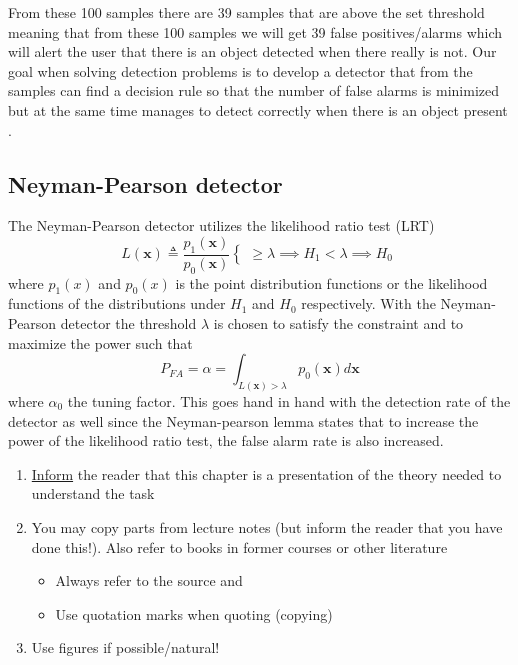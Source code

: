 From these 100 samples there are 39 samples that are above the set threshold meaning that from these 100 samples we will get 39 false positives/alarms which will alert the user that there is an object detected when there really is not. Our goal when solving detection problems is to develop a detector that from the samples can find a decision rule so that the number of false alarms is minimized but at the same time manages to detect correctly when there is an object present \cite{Myrvoll2020}.\\

\subsection{Neyman-Pearson detector}
The Neyman-Pearson detector utilizes the likelihood ratio test (LRT)
\begin{equation}
	L(\mathbf{x}) \triangleq \frac{p_1(\mathbf{x})}{p_0(\mathbf{x})} 
		\begin{cases}
			\geq \lambda \implies H_1
			< \lambda \implies H_0
		\end{cases} 
\end{equation}
where $p_1(x)$ and $p_0(x)$ is the point distribution functions or the likelihood functions of the distributions under $H_1$ and $H_0$ respectively.
With the Neyman-Pearson detector the threshold $\lambda$ is chosen to satisfy the constraint and to maximize the power such that
\begin{equation}
	P_{FA} = \alpha = \int_{L(\mathbf{x})>\lambda}p_0(\mathbf{x})d\mathbf{x}
\end{equation}
where $\alpha_0$ the tuning factor. This goes hand in hand with the detection rate of the detector as well since the Neyman-pearson lemma states that to increase the power of the likelihood ratio test, the false alarm rate is also increased. 
\begin{enumerate}[i]
	\item \underline{Inform} the reader that this chapter is a presentation of the theory needed to understand the task
	\item You may copy parts from lecture notes (but inform
	the reader that you have done this!). Also refer to
	books in former courses or other literature
	\begin{itemize}
		\item Always refer to the source and
		\item Use quotation marks when quoting (copying) 
	\end{itemize}
	\item Use figures if possible/natural!
\end{enumerate}